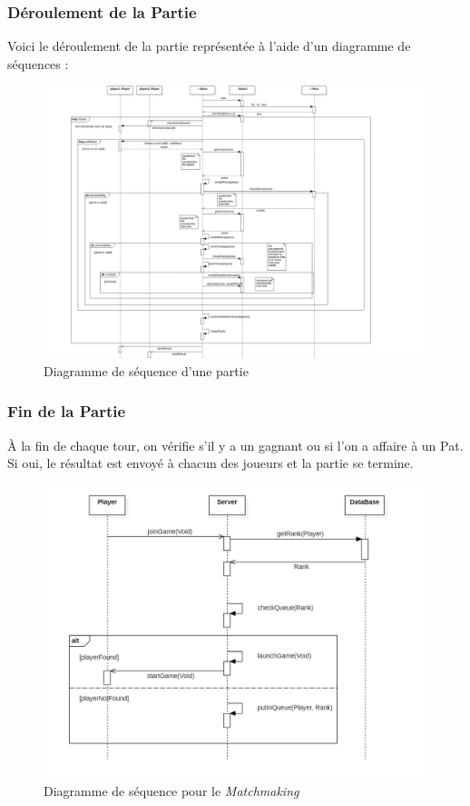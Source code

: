 \documentclass[10pt, a4paper]{article}
\begin{document}
\subsubsection{Déroulement de la Partie}
Voici le déroulement de la partie représentée à l'aide d'un diagramme de séquences : \\

\begin{figure}[ht]
\centering
\includegraphics[scale=0.8]{SequenceDiagramClassicChessTurn.png}
\caption{Diagramme de séquence d'une partie}
\label{SD_classicgame}
\end{figure}
\clearpage



\subsubsection{Fin de la Partie}
À la fin de chaque tour, on vérifie s'il y a un gagnant ou si l'on a affaire à un Pat. Si oui, le résultat est envoyé à chacun des joueurs et la partie se termine.


\begin{figure}[ht]
\centering
\includegraphics[scale=0.72]{SequenceDiagramMatchmaking.PNG}
\caption{Diagramme de séquence pour le \textit{Matchmaking}}
\label{SD_matchmaker} %
\end{figure}
\end{document}

